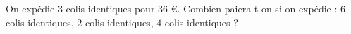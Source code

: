 
\begin{exercice}\label{exosmath-0944}

On expédie $3$ colis identiques pour $36$ €. Combien paiera-t-on si on expédie : $6$ colis identiques, $2$ colis identiques, $4$ colis identiques ?

\end{exercice}
